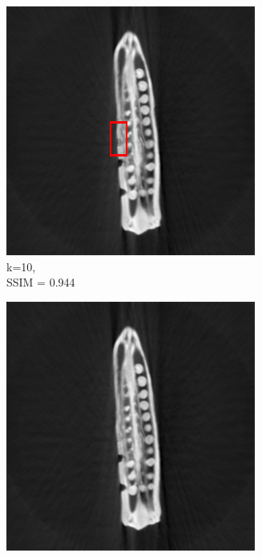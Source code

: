\documentclass[journal]{IEEEtran}
\begin{document}
\begin{figure}[h]
    \begin{subfigure}[b]{0.24\linewidth}
        \includegraphics[width=\textwidth]{../images/okra/2D_okra/weighted_pca10_colorIm.png}
        \caption{k=10,\\ SSIM = 0.944}
     \end{subfigure}     
  \begin{subfigure}[b]{0.24\linewidth}
        \includegraphics[width=\textwidth]{../images/okra/2D_okra/weighted_pca50.png}

\end{subfigure}
\end{figure}
\end{document}
